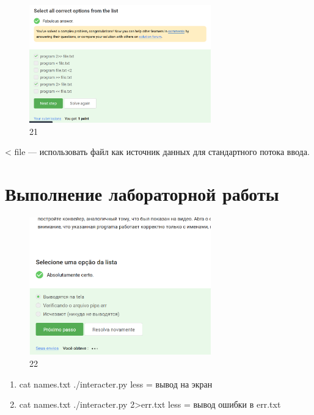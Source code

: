 \begin{figure}
\hypertarget{fig:021}{%
\centering
\includegraphics[width=0.7\textwidth,height=\textheight]{image/21.png}
\caption{21}\label{fig:021}
}
\end{figure}

\textless{} file --- использовать файл как источник данных для
стандартного потока ввода.

\hypertarget{ux432ux44bux43fux43eux43bux43dux435ux43dux438ux435-ux43bux430ux431ux43eux440ux430ux442ux43eux440ux43dux43eux439-ux440ux430ux431ux43eux442ux44b-15}{%
\section{Выполнение лабораторной
работы}\label{ux432ux44bux43fux43eux43bux43dux435ux43dux438ux435-ux43bux430ux431ux43eux440ux430ux442ux43eux440ux43dux43eux439-ux440ux430ux431ux43eux442ux44b-15}}

\begin{figure}
\hypertarget{fig:022}{%
\centering
\includegraphics[width=0.7\textwidth,height=\textheight]{image/22.png}
\caption{22}\label{fig:022}
}
\end{figure}

\begin{enumerate}
\def\labelenumi{\arabic{enumi}.}
\item
  cat names.txt \textbar{} ./interacter.py \textbar{} less = вывод на
  экран
\item
  cat names.txt \textbar{} ./interacter.py 2\textgreater err.txt
  \textbar{} less = вывод ошибки в err.txt
\end{enumerate}

